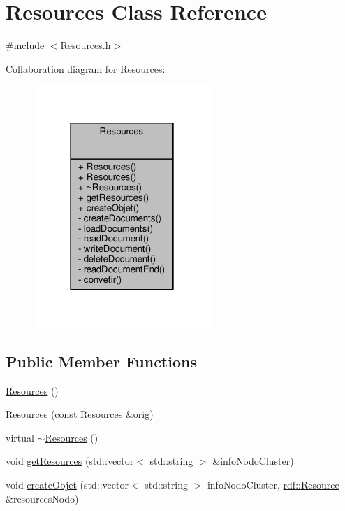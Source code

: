 \hypertarget{classResources}{}\section{Resources Class Reference}
\label{classResources}


{\ttfamily \#include $<$Resources.\+h$>$}



Collaboration diagram for Resources\+:
\nopagebreak
\begin{figure}[H]
\begin{center}
\leavevmode
\includegraphics[width=190pt]{classResources__coll__graph}
\end{center}
\end{figure}
\subsection*{Public Member Functions}
\begin{DoxyCompactItemize}
\item 
\hyperlink{classResources_ab09435991b8c485f92e0aa1fd00828b9}{Resources} ()
\item 
\hyperlink{classResources_a1167e3cc0cfb0208c15b111537924ad9}{Resources} (const \hyperlink{classResources}{Resources} \&orig)
\item 
virtual \hyperlink{classResources_a5b75a9c6c6f5530ef807cce41cef81ee}{$\sim$\+Resources} ()
\item 
void \hyperlink{classResources_a9dfd1c5bb25dfe6d8d3fbb1d3b913bac}{get\+Resources} (std\+::vector$<$ std\+::string $>$ \&info\+Nodo\+Cluster)
\item 
void \hyperlink{classResources_ac1c8e38749088e3fc4211d9e3d72d18c}{create\+Objet} (std\+::vector$<$ std\+::string $>$ info\+Nodo\+Cluster, \hyperlink{classrdf_1_1Resource}{rdf\+::\+Resource} \&resources\+Nodo)
\end{DoxyCompactItemize}
